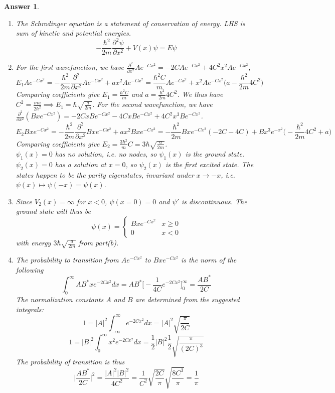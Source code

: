 \documentclass[a4paper]{article}
\newtheorem{ans}{Answer}[subsection]
\theoremstyle{new}
\begin{document}
\begin{ans}\leavevmode
\begin{enumerate}[label=(\alph*)]
\item The Schrodinger equation is a statement of conservation of energy. LHS is sum of kinetic and potential energies.
$$-\frac{\hbar^2}{2m}\frac{\partial^2\psi}{\partial x^2}+V(x)\psi=E\psi$$
\item For the first wavefunction, we have $\frac{\partial^2}{\partial x^2}Ae^{-Cx^2}=-2CAe^{-Cx^2}+4C^2x^2Ae^{-Cx^2}$,
$$E_1Ae^{-Cx^2}=-\frac{\hbar^2}{2m}\frac{\partial^2}{\partial x^2}Ae^{-Cx^2}+ax^2Ae^{-Cx^2}=\frac{\hbar^2C}{m}Ae^{-Cx^2}+x^2Ae^{-Cx^2}\bigg(a-\frac{\hbar^2}{2m}4C^2\bigg)$$
Comparing coefficients give $E_1=\frac{\hbar^2C}{m}$ and $a=\frac{\hbar^2}{2m}4C^2$. We thus have $C^2=\frac{ma}{2\hbar^2}\implies E_1=\hbar\sqrt{\frac{a}{2m}}$. For the second wavefunction, we have $\frac{\partial^2}{\partial x^2}(Bxe^{-Cx^2})=-2CxBe^{-Cx^2}-4CxBe^{-Cx^2}+4C^2x^3Be^{-Cx^2}$.
$$E_2Bxe^{-Cx^2}=-\frac{\hbar^2}{2m}\frac{\partial^2}{\partial x^2}Bxe^{-Cx^2}+ax^2Bxe^{-Cx^2}=-\frac{\hbar^2}{2m}Bxe^{-Cx^2}(-2C-4C)+Bx^3e^{-x^2}\bigg(-\frac{\hbar^2}{2m}4C^2+a\bigg)$$
Comparing coefficients give $E_2=\frac{3\hbar^2}{m}C=3\hbar\sqrt{\frac{a}{2m}}$.\\[5pt]
$\psi_1(x)=0$ has no solution, i.e. no nodes, so $\psi_1(x)$ is the ground state. $\psi_2(x)=0$ has a solution at $x=0$, so $\psi_2(x)$ is the first excited state. The states happen to be the parity eigenstates, invariant under $x\rightarrow-x$, i.e. $\psi(x)\mapsto\psi(-x)=\psi(x)$.
\item Since $V_2(x)=\infty$ for $x<0$, $\psi(x=0)=0$ and $\psi'$ is discontinuous. The ground state will thus be
$$\psi(x)=
\left\{
        \begin{array}{ll}
      Bxe^{-Cx^2} & x\geq0 \\
      0 & x<0
        \end{array}
    \right.$$
with energy $3\hbar\sqrt{\frac{a}{2m}}$ from part(b).
\item The probability to transition from $Ae^{-Cx^2}$ to $Bxe^{-Cx^2}$ is the norm of the following
$$\int_0^\infty AB^*xe^{-2Cx^2}dx=AB^*\bigg[-\frac{1}{4C}e^{-2Cx^2}\bigg]_0^\infty=\frac{AB^*}{2C}$$
The normalization constants $A$ and $B$ are determined from the suggested integrals:
$$1=|A|^2\int_{-\infty}^\infty e^{-2Cx^2}dx=|A|^2\sqrt{\frac{\pi}{2C}}$$
$$1=|B|^2\int_{0}^\infty x^2e^{-2Cx^2}dx=\frac{1}{2}|B|^2\frac{1}{2}\sqrt{\frac{\pi}{(2C)^3}}$$
The probability of transition is thus
$$\bigg|\frac{AB^*}{2C}\bigg|^2=\frac{|A|^2|B|^2}{4C^2}=\frac{1}{C^2}\sqrt{\frac{2C}{\pi}}\sqrt{\frac{8C^3}{\pi}}=\frac{1}{\pi}$$
\end{enumerate}
\end{ans}
\end{document}

